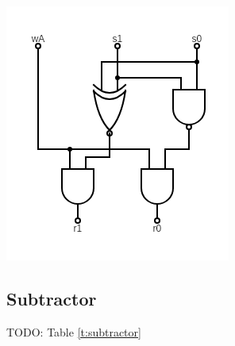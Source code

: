 \documentclass[12pt,notitlepage]{article}
\newcommand{\TODO}[1]{\textrm{\color{red}TODO: #1}}
\begin{document}
\begin{table}[hpbt]
\begin{minipage}{0.3\textwidth}
		\includegraphics[width=\linewidth]{circuits/Logical-PlayerA}
	\end{minipage}
	
	\caption{%
		Logical circuit for {Player A}.
		The input is a
		wake-up signal 
		and the bits
		/
		of the current number of sticks
		().
		The output is
		the number of sticks that 
		the player chooses to take,
		encoded as .
		Note that the output is cut off
		when  is absent.
		The circuit for {Player B}
		is identical except
		that it is woken up by .
	}
	
	\label{t:logical-playera}
	
\end{table}


\subsection{Subtractor}

\TODO{Table \ref{t:subtractor}}
\end{document}
